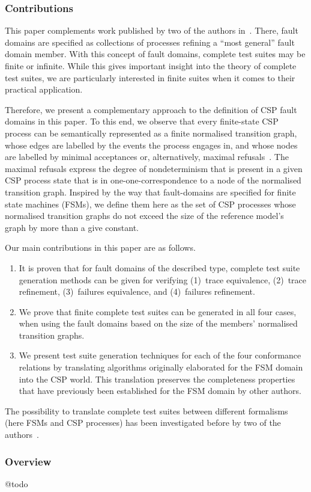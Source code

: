 \subsubsection*{Contributions}

This paper complements work published by two of the authors
in~\cite{DBLP:conf/pts/CavalcantiS17}. There, fault domains are specified as
collections of processes refining a  ``most general'' fault domain member.
With this concept of fault domains, complete test suites may be finite or
infinite. While this gives important insight into the theory of complete test
suites, we are particularly interested in finite suites when it comes to
their practical application.

Therefore, we present a complementary approach to the definition of CSP fault
domains in this paper. To this end, we observe that every finite-state CSP
process can be semantically represented as a finite normalised transition
graph, whose edges are labelled by the events the process engages in, and
whose nodes are labelled by minimal acceptances or, alternatively, maximal
refusals~\cite{Roscoe:1994:CME:197600}. The maximal refusals  express the
degree of nondeterminism that is present in a given CSP process state that is
in one-one-correspondence to a node of the normalised transition graph.
Inspired by the way that fault-domains are specified for finite state
machines (FSMs), we define them here as the set of CSP processes whose
normalised transition graphs do not exceed the size of the reference model's
graph by more than a give constant.

Our main contributions in this paper are as follows.
%
\begin{enumerate}
\item It is proven that for fault domains of the described type, complete
    test suite generation methods can be given for verifying (1)~trace
    equivalence, (2)~trace refinement, (3)~failures equivalence, and
    (4)~failures refinement.

\item We prove that finite complete test suites can be generated in all
    four cases, when using the fault domains based on the size of the
    members' normalised transition graphs.

\item We present test suite generation techniques for each of the four
    conformance relations by translating algorithms originally elaborated
    for the FSM domain into the CSP world. This translation preserves the
    completeness properties that have previously been established for the
    FSM domain by other authors.
\end{enumerate}
%
The possibility to translate complete test suites between different
formalisms (here FSMs and CSP processes) has been investigated before by two
of the authors~\cite{Huang2017}. 


\subsubsection*{Overview}

@todo


